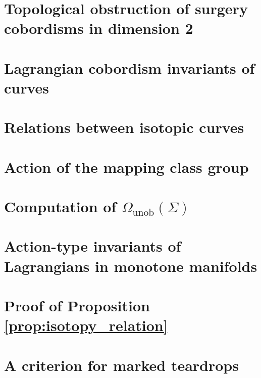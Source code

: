 \documentclass[12pt,reqno]{amsart}
\newcommand{\Gunob}{\Omega_{\operatorname{unob}}}
\theoremstyle{plain}
\theoremstyle{definition}
\theoremstyle{remark}
\begin{document}
\section{Topological obstruction of surgery cobordisms in dimension 2}
\label{section:obstruction_dim2}



\section{Lagrangian cobordism invariants of curves}
\label{section:invariants}



\section{Relations between isotopic curves}
\label{section:isotopies}



\section{Action of the mapping class group}
\label{section:action_mcg}



\section{Computation of \texorpdfstring{$\Gunob(\Sigma)$}{the unobstructed cobordism group}}
\label{section:computation}



\appendix

\section{Action-type invariants of Lagrangians in monotone manifolds}
\label{appendix:action}



\section{Proof of Proposition \ref{prop:isotopy_relation}}
\label{appendix:isotopy}



\section{A criterion for marked teardrops}
\label{appendix:teardrops}





	
\end{document}
